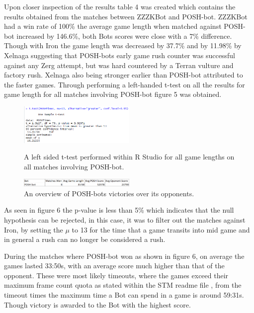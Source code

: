 \documentclass[journal]{IEEEtran}
\begin{document}
	Upon closer inspection of the results table 4 was created which contains the results obtained from the matches between ZZZKBot and POSH-bot. ZZZKBot had a win rate of 100\% the average game length when matched against POSH-bot increased by 146.6\%, both Bots scores were close with a 7\% difference. Though with Iron the game length was decreased by 37.7\% and by 11.98\% by Xelnaga suggesting that POSH-bots early game rush counter was successful against any Zerg attempt, but was hard countered by a Terran vulture and factory rush. Xelnaga also being stronger earlier than POSH-bot attributed to the faster games. Through performing a left-handed t-test on all the results for game length for all matches involving POSH-bot figure 5 was obtained.
	
	\begin{figure}[H]
		\centering
		\includegraphics[width=0.5\textwidth]{RPoshTimeLeft}
		\caption{A left sided t-test performed within R Studio for all game lengths on all matches involving POSH-bot.}
		\label{Fig5}
		\centering
		\includegraphics[width=0.5\textwidth]{PoshWinsandScore}
		\caption{An overview of POSH-bots victories over its opponents.}
		\label{poshonly}
	\end{figure}
	
	As seen in figure 6 the p-value is less than 5\% which indicates that the null hypothesis can be rejected, in this case, it was to filter out the matches against Iron, by setting the $\mu$ to 13 for the time that a game transits into mid game and in general a rush can no longer be considered a rush. 
	
	During the matches where POSH-bot won as shown in figure 6, on average the games lasted 33:50s, with an average score much higher than that of the opponent. These were most likely timeouts, where the games exceed their maximum frame count quota as stated within the STM readme file \cite{Tournament}, from the timeout times the maximum time a Bot can spend in a game is around 59:31s. Though victory is awarded to the Bot with the highest score.
	
\end{document}
